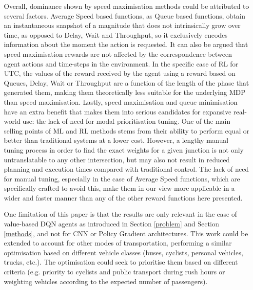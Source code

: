 \documentclass[a4paper, conference]{IEEEtran}
\begin{document}
Overall, dominance shown by speed maximisation methods could be attributed to several factors.
Average Speed based functions, as Queue based functions, obtain an instantaneous snapshot of a magnitude that does not intrinsically grow over time, as opposed to Delay, Wait and Throughput, so it exclusively encodes information about the moment the action is requested.
It can also be argued that speed maximisation rewards are not affected by the correspondence between agent actions and time-steps in the environment. In the specific case of RL for UTC, the values of the reward received by the agent using a reward based on Queues, Delay, Wait or Throughput are a function of the length of the phase that generated them, making them theoretically less suitable for the underlying MDP than speed maximisation.
Lastly, speed maximisation and queue minimisation have an extra benefit that makes them into serious candidates for expansive real-world use: the lack of need for modal prioritisation tuning.
One of the main selling points of ML and RL methods stems from their ability to perform equal or better than traditional systems at a lower cost.
However, a lengthy manual tuning process in order to find the exact weights for a given junction is not only untranslatable to any other intersection, but may also not result in reduced planning and execution times compared with traditional control.
The lack of need for manual tuning, especially in the case of Average Speed functions, which are specifically crafted to avoid this, make them in our view more applicable in a wider and faster manner than any of the other reward functions here presented.

One limitation of this paper is that the results are only relevant in the case of value-based DQN agents as introduced in Section \ref{problem} and Section \ref{methods}, and not for CNN or Policy Gradient architectures.
This work could be extended to account for other modes of transportation, performing a similar optimisation based on different vehicle classes (buses, cyclists, personal vehicles, trucks, etc.). The optimisation could seek to prioritise them based on different criteria (e.g. priority to cyclists and public transport during rush hours or weighting vehicles according to the expected number of passengers).

%
\end{document}
